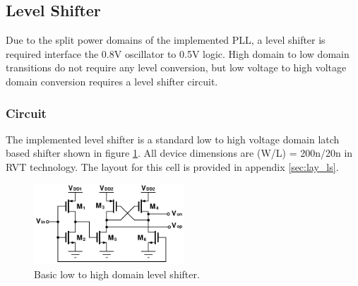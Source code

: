 




	\FloatBarrier
	\vspace{-1.5em}
	\subsection{Level Shifter}
	Due to the split power domains of the implemented PLL, a level shifter is required interface the 0.8V oscillator to 0.5V logic. High domain to low domain transitions do not require any level conversion, but low voltage to high voltage domain conversion requires a level shifter circuit. 

		\vspace{-1em}
		\subsubsection{Circuit}
			The implemented level shifter is a standard low to high voltage domain latch based shifter \cite{weste_harris_2011} shown in figure \ref{fig:level_shifter}. All device dimensions are (W/L) = 200n/20n in RVT technology. The layout for this cell is provided in appendix \ref{sec:lay_ls}.
			
			\vspace{-0.5em}
			\begin{figure}[htb!]
			        \centering
			        \includegraphics[width=0.5\textwidth, angle=0]{./figs/design/level_shift}
			    \caption{Basic low to high domain level shifter.}
			    \label{fig:level_shifter}
			\end{figure}






